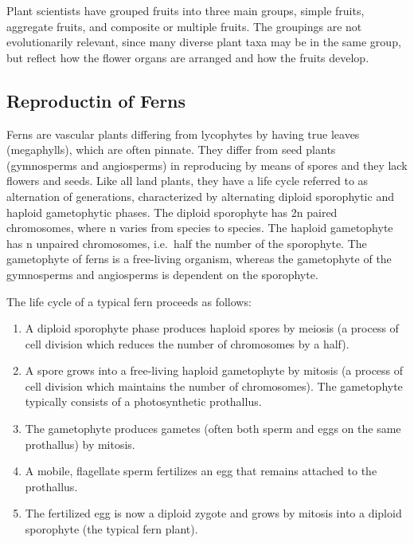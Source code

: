 Plant scientists have grouped fruits into three main groups, simple fruits, aggregate fruits, and composite or multiple fruits. The groupings are not evolutionarily relevant, since many diverse plant taxa may be in the same group, but reflect how the flower organs are arranged and how the fruits develop.

\hypertarget{reproductin-of-ferns}{%
\subsection{Reproductin of Ferns}\label{reproductin-of-ferns}}

Ferns are vascular plants differing from lycophytes by having true leaves (megaphylls), which are often pinnate. They differ from seed plants (gymnosperms and angiosperms) in reproducing by means of spores and they lack flowers and seeds. Like all land plants, they have a life cycle referred to as alternation of generations, characterized by alternating diploid sporophytic and haploid gametophytic phases. The diploid sporophyte has 2n paired chromosomes, where n varies from species to species. The haploid gametophyte has n unpaired chromosomes, i.e.~half the number of the sporophyte. The gametophyte of ferns is a free-living organism, whereas the gametophyte of the gymnosperms and angiosperms is dependent on the sporophyte.

The life cycle of a typical fern proceeds as follows:

\begin{enumerate}
\def\labelenumi{\arabic{enumi}.}
\tightlist
\item
  A diploid sporophyte phase produces haploid spores by meiosis (a process of cell division which reduces the number of chromosomes by a half).
\item
  A spore grows into a free-living haploid gametophyte by mitosis (a process of cell division which maintains the number of chromosomes). The gametophyte typically consists of a photosynthetic prothallus.
\item
  The gametophyte produces gametes (often both sperm and eggs on the same prothallus) by mitosis.
\item
  A mobile, flagellate sperm fertilizes an egg that remains attached to the prothallus.
\item
  The fertilized egg is now a diploid zygote and grows by mitosis into a diploid sporophyte (the typical fern plant).
\end{enumerate}


